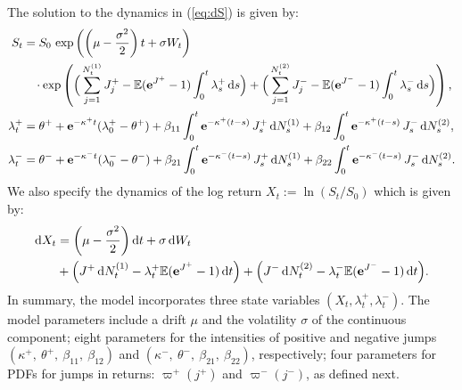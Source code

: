 \documentclass[11pt,a4paper]{article}
\numberwithin{equation}{section}
\theoremstyle{remark}
\theoremstyle{definition}
\newcommand{\E}{{\mathbb{E}}}
\newcommand{\e}{{\bf e}}
\newcommand{\dd}{{\rm d}}
\begin{document}
The solution to the dynamics in (\ref{eq:dS}) is given by:
  \begin{align}
    S_t &= S_0 \, \exp\left(\left(\mu-\frac{\sigma^2}{2}\right) t + \sigma W_t \right)\\
    &\phantom{=\,} \cdot \exp\left(
     \Big(\sum_{j=1}^{N_t^{(1)}} J_j^+ -\E(\e^{J^+}-1) \int_0^t \lambda_s^+\, \dd s\Big)
    + \Big(\sum_{j=1}^{N_t^{(2)}} J_j^- -\E(\e^{J^-}-1) \int_0^t \lambda_s^-\, \dd s\Big)
    \right),\nonumber\\
    \lambda_t^+ &= \theta^+ + \e^{-\kappa^+ t} (\lambda^+_0 - \theta^+)
                  + \beta_{11} \int_0^t \e^{-\kappa^+ (t-s)}\, J^+_s\,
                  \dd N_s^{(1)} %
                  + \beta_{12} \int_0^t \e^{-\kappa^+ (t-s)}\, J^-_s\,
                  \dd N_s^{(2)}\label{eq:lambda_p_sol},\\
    \lambda_t^- &= \theta^- + \e^{-\kappa^- t} (\lambda^-_0 - \theta^-)
                  + \beta_{21} \int_0^t \e^{-\kappa^- (t-s)}\, J^+_s\,
                  \dd N_s^{(1)} %
                  + \beta_{22} \int_0^t \e^{-\kappa^- (t-s)}\, J^-_s\,
                  \dd N_s^{(2)}\label{eq:lambda_m_sol}.
  \end{align}
We also specify the dynamics of the log return $X_t:=\ln \left(S_t/S_0\right)$ which is given by:
\begin{equation}\label{eq:dx}
\begin{split}
      \dd X_t  & = \left(\mu-\frac{\sigma^2}{2}\right) \dd t + \sigma \,\dd W_t \\
  & + \Big(J^+\, \dd N_t^{(1)} - \lambda_t^+ \E(\e^{J^+}-1) \, \dd t\Big)
  + \Big(J^-\, \dd N_t^{(2)}- \lambda_t^-\E(\e^{J^-}-1)\, \dd t\Big).
  \end{split}
\end{equation}
In summary, the model incorporates three state variables $(X_t, \lambda^+_t, \lambda^-_t)$. The model parameters include a drift $\mu$ and the volatility $\sigma$ of the continuous component;
eight parameters for the intensities of positive and negative jumps $(\kappa^{+},\ \theta^{+},\ \beta_{11},\ \beta_{12})$ and $(\kappa^{-},\ \theta^{-},\ \beta_{21},\ \beta_{22})$, respectively;
four parameters for PDFs for jumps in returns: $\varpi^{+}(j^{+})$ and $\varpi^{-}(j^{-})$, as defined next.
\end{document}
